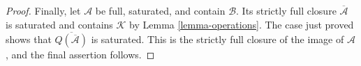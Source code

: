 \begin{proof}
Finally, let $\mathcal{A}$ be full, saturated, and contain $\mathcal{B}$.
Its strictly full closure $\overline{\mathcal{A}}$ is saturated and
contains $\mathcal{K}$ by Lemma \ref{lemma-operations}. The case just
proved shows that $\overline{Q(\overline{\mathcal{A}})}$ is saturated.
This is the strictly full closure of the image of $\mathcal{A}$, and the
final assertion follows.
\end{proof}
